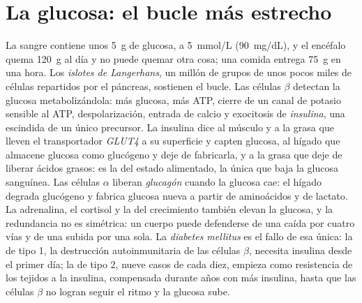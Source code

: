 \section{La glucosa: el bucle más estrecho}

\begin{definition}\label{def:b3:endocrinology:glucose}
La sangre contiene unos \qty{5}{g} de glucosa, a \qty{5}{mmol/L}
(\qty{90}{mg/dL}), y el encéfalo quema \qty{120}{g} al día y no puede
quemar otra cosa; una comida entrega \qty{75}{g} en una hora. Los
\emph{islotes de Langerhans}, un millón de grupos de unos pocos miles
de células repartidos por el páncreas, sostienen el bucle. Las células
$\beta$ detectan la glucosa metabolizándola: más glucosa, más ATP,
cierre de un canal de potasio sensible al ATP, despolarización, entrada
de calcio y exocitosis de \emph{insulina}, una 
escindida de un único precursor. La insulina dice al músculo y a la
grasa que lleven el transportador \emph{GLUT4} a su superficie y capten
glucosa, al hígado que almacene glucosa como glucógeno y deje de
fabricarla, y a la grasa que deje de liberar ácidos grasos: es la
 del estado alimentado, la única que baja la glucosa sanguínea.
Las células $\alpha$ liberan \emph{glucagón} cuando la glucosa cae: el
hígado degrada glucógeno y fabrica glucosa nueva a partir de
aminoácidos y de lactato. La adrenalina, el cortisol y la  del
crecimiento también elevan la glucosa, y la redundancia no es
simétrica: un cuerpo puede defenderse de una caída por cuatro vías y de
una subida por una sola. La \emph{diabetes mellitus} es el fallo de esa
única: la de tipo 1, la destrucción autoinmunitaria de las células
$\beta$, necesita insulina desde el primer día; la de tipo 2, nueve
casos de cada diez, empieza como resistencia de los tejidos a la
insulina, compensada durante años con más insulina, hasta que las
células $\beta$ no logran seguir el ritmo y la glucosa sube.
\end{definition}

